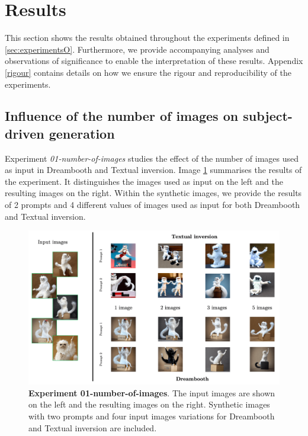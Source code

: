\section{Results} \label{sec: results} 

This section shows the results obtained throughout the experiments defined in \ref{sec:experimentsO}. Furthermore, we provide accompanying analyses and observations of significance to enable the interpretation of these results. Appendix \ref{rigour} contains details on how we ensure the rigour and reproducibility of the experiments.

\subsection{Influence of the number of images on subject-driven generation} \label{sec: exp-01}

Experiment \textit{01-number-of-images} studies the effect of the number of images used as input in Dreambooth and Textual inversion. Image \ref{fig:exp1} summarises the results of the experiment. It distinguishes the images used as input on the left and the resulting images on the right. Within the synthetic images, we provide the results of 2 prompts and 4 different values of images used as input for both Dreambooth and Textual inversion.   

\begin{figure}
    \centering
    \includegraphics[width=1\textwidth]{Pictures/exp1.png} 
    \caption{\textbf{Experiment 01-number-of-images}. The input images are shown on the left and the resulting images on the right. Synthetic images with two prompts and four input images variations for Dreambooth and Textual inversion are included.}
    \label{fig:exp1}
\end{figure}

